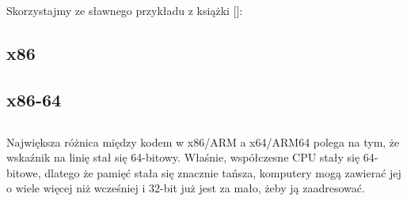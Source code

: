 \mysection{\HelloWorldSectionName}
\label{sec:helloworld}

Skorzystajmy ze sławnego przykładu z książki [\KRBook]:



\subsection{x86}





\subsection{x86-64}







\subsection{\Conclusion{}}

Największa różnica między kodem w x86/ARM a x64/ARM64 polega na tym, że wskaźnik na linię stał się 64-bitowy.
Właśnie, współczesne \ac{CPU} stały się 64-bitowe, dlatego że pamięć stała się znacznie tańsza,
komputery mogą zawierać jej o wiele więcej niż wcześniej i 32-bit już jest za mało, żeby ją zaadresować.




